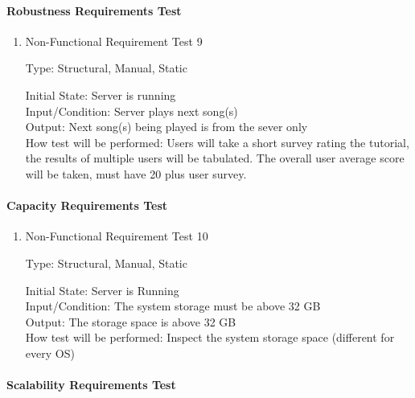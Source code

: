 \documentclass[12pt, titlepage]{article}
\begin{document}
\paragraph{Robustness Requirements Test}

\begin{enumerate}

\item{Non-Functional Requirement Test 9\\}

Type: Structural, Manual, Static
					
Initial State: Server is running \\
					
Input/Condition: Server plays next song(s) \\
					
Output: Next song(s) being played is from the sever only \\
					
How test will be performed: Users will take a short survey rating the tutorial, the results of multiple users will be
tabulated. The overall user average score will be taken, must have 20 plus user survey. \\
\end{enumerate}


\paragraph{Capacity Requirements Test}

\begin{enumerate}

\item{Non-Functional Requirement Test 10\\}

Type: Structural, Manual, Static
					
Initial State: Server is Running \\
					
Input/Condition: The system storage must be above 32 GB  \\
					
Output: The storage space is above 32 GB \\
					
How test will be performed: Inspect the system storage space (different for every OS) \\
\end{enumerate}

\paragraph{Scalability Requirements Test}
\end{document}

